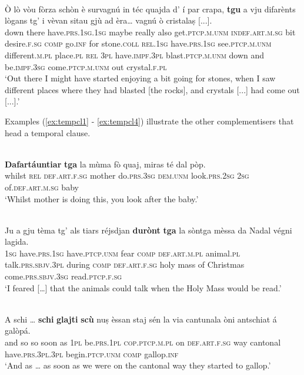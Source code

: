 \ea
\label{ex:tempcltgu3}
\\
\gll  Ò lò vòu fòrza schòn è survagnú in téc quajda d' í par crapa, \textbf{tgu} a vju difarènts lògans tg’ i vèvan sitau gjù ad èra… vagnú ò cristalaṣ [...]. \\
down there  have.\textsc{prs.1sg.1sg} maybe really also get.\textsc{ptcp.m.unm} \textsc{indef.art.m.sg} bit desire.\textsc{f.sg} \textsc{comp} go.\textsc{inf} for stone.\textsc{coll} \textsc{rel.1sg} have.\textsc{prs.1sg} see.\textsc{ptcp.m.unm} different.\textsc{m.pl} place.\textsc{pl} \textsc{rel} \textsc{3pl} have.\textsc{impf.3pl} blast.\textsc{ptcp.m.unm} down and  be.\textsc{impf.3sg} come.\textsc{ptcp.m.unm} out crystal.\textsc{f.pl}\\
\glt `Out there I might have started enjoying a bit going for stones, when I saw different places where they had blasted [the rocks], and crystals [...] had come out [...].'
\z

Examples (\ref{ex:tempcl1} - \ref{ex:tempcl4}) illustrate the other complementisers that head a temporal clause.

\ea
\label{ex:tempcl1}
\\
\gll \textbf{Dafartáuntiar} \textbf{tga} la mùma fò quaj, miras té dal pòp.\\
whilst \textsc{rel} \textsc{def.art.f.sg} mother do.\textsc{prs.3sg} \textsc{dem.unm} look.\textsc{prs.2sg} \textsc{2sg} of.\textsc{def.art.m.sg} baby\\
\glt `Whilst mother is doing this, you look after the baby.'
\z


\ea
\label{ex:tempcl2}
 {\citealt[19]{Büchli1966}}\\
\gll    Ju a gju tèma tg’ als tiars réjsdjan \textbf{durònt} \textbf{tga} la sòntga mèssa da Nadal végni lagida.\\
      \textsc{1sg} have.\textsc{prs.1sg} have.\textsc{ptcp.unm} fear \textsc{comp} \textsc{def.art.m.pl} animal.\textsc{pl} talk.\textsc{prs.sbjv.3pl} during \textsc{comp} \textsc{def.art.f.sg} holy mass of Christmas come.\textsc{prs.sbjv.3sg} read.\textsc{ptcp.f.sg}\\
\glt `I feared […] that the animals could talk when the Holy Mass would be read.'
\z

\ea
\label{ex:tempcl3}
\\
\gll  A schi … \textbf{schi} \textbf{glajti} \textbf{scù} nuṣ èssan staj sén la via cantunala òni antschiat á galòpá.  \\
and so {} so soon as \textsc{1pl} be.\textsc{prs.1pl} \textsc{cop.ptcp.m.pl} on \textsc{def.art.f.sg} way cantonal have.\textsc{prs.3pl.3pl} begin.\textsc{ptcp.unm} \textsc{comp} gallop.\textsc{inf}\\
\glt `And as … as soon as we were on the cantonal way they started to gallop.'
\z

